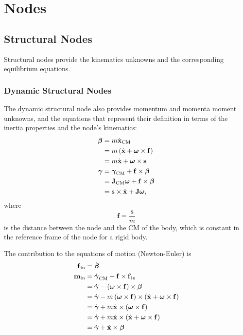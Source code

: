 \documentclass[10pt,dvips,fleqn,subeqn]{report}
\newcommand{\T}[1]{\bm{\mathbf{#1}}}
\newcommand{\TT}[1]{\bm{\mathbf{#1}}}
\begin{document}
\chapter{Nodes}
\label{sec:nodes}

\section{Structural Nodes}
\label{sec:nodes:structural nodes}
Structural nodes provide the kinematics unknowns
and the corresponding equilibrium equations.

\subsection{Dynamic Structural Nodes}
\label{sec:nodes:structural nodes:dynamic structural nodes}
The dynamic structural node also provides momentum and momenta moment
unknowns, and the equations that represent their definition
in terms of the inertia properties and the node's kinematics:
\begin{subequations}
\label{eq:body:momenta}
\begin{align}
	\T{\beta}
	&= m \dot{\T{x}}_{\text{CM}} \nonumber \\
	&= m \plbr{\dot{\T{x}} + \T{\omega}\times\T{f}} \nonumber \\
	&= m \dot{\T{x}} + \T{\omega} \times \T{s}
	\label{eq:body:momentum} \\
	\T{\gamma}
	&= \T{\gamma}_{\text{CM}} + \T{f} \times\T{\beta} \nonumber \\
	&= \TT{J}_{\text{CM}} \T{\omega} + \T{f} \times\T{\beta} \nonumber \\
	&= \T{s} \times \dot{\T{x}} + \TT{J} \T{\omega}
	\label{eq:body:momenta-moment} ,
\end{align}
\end{subequations}
where
\begin{equation}
	\T{f} = \frac{\T{s}}{m}
\end{equation}
is the distance between the node and the CM of the body,
which is constant in the reference frame of the node
for a rigid body.

The contribution to the equations of motion (Newton-Euler) is
\begin{subequations}
\begin{align}
	\T{f}_{\text{in}} &= \dot{\T{\beta}} \\
	\T{m}_{\text{in}} &= \dot{\T{\gamma}}_{\text{CM}} + \T{f}\times\T{f}_{\text{in}} \nonumber \\
	&= \dot{\T{\gamma}} - \plbr{\T{\omega}\times\T{f}}\times\T{\beta} \nonumber \\
	&= \dot{\T{\gamma}} - m \plbr{\T{\omega}\times\T{f}}\times\plbr{\dot{\T{x}} + \T{\omega}\times\T{f}} \nonumber \\
	&= \dot{\T{\gamma}} + m \dot{\T{x}}\times\plbr{\T{\omega}\times\T{f}} \nonumber \\
	&= \dot{\T{\gamma}} + m \dot{\T{x}}\times\plbr{\dot{\T{x}} + \T{\omega}\times\T{f}} \nonumber \\
	&= \dot{\T{\gamma}} + \dot{\T{x}}\times\T{\beta}
\end{align}
\end{subequations}
\end{document}
